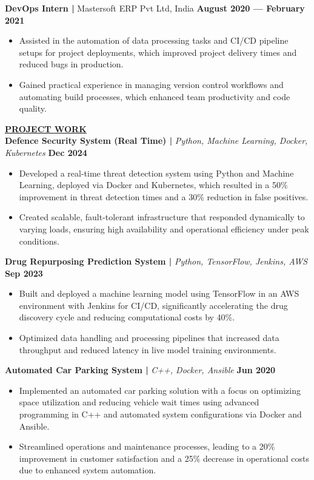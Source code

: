 \documentclass{article}
\begin{document}
\noindent \textbf{DevOps Intern | } Mastersoft ERP Pvt Ltd, India \hfill \textbf{August 2020 — February 2021}
\begin{itemize}[noitemsep,nolistsep,leftmargin=*]
\item {\small Assisted in the automation of data processing tasks and CI/CD pipeline setups for project deployments, which improved project delivery times and reduced bugs in production.}
\item {\small Gained practical experience in managing version control workflows and automating build processes, which enhanced team productivity and code quality.}\\
\end{itemize}

\noindent \textbf{\underline{PROJECT WORK}} \\
\noindent \textbf{Defence Security System (Real Time) | } \textit{Python, Machine Learning, Docker, Kubernetes} \hfill \textbf{Dec 2024}
\begin{itemize}[noitemsep,nolistsep,leftmargin=*]
\item {\small Developed a real-time threat detection system using Python and Machine Learning, deployed via Docker and Kubernetes, which resulted in a 50\% improvement in threat detection times and a 30\% reduction in false positives.}
\item {\small Created scalable, fault-tolerant infrastructure that responded dynamically to varying loads, ensuring high availability and operational efficiency under peak conditions.}
\end{itemize}

\noindent \textbf{Drug Repurposing Prediction System | } \textit{Python, TensorFlow, Jenkins, AWS} \hfill \textbf{Sep 2023}
\begin{itemize}[noitemsep,nolistsep,leftmargin=*]
\item {\small Built and deployed a machine learning model using TensorFlow in an AWS environment with Jenkins for CI/CD, significantly accelerating the drug discovery cycle and reducing computational costs by 40\%.}
\item {\small Optimized data handling and processing pipelines that increased data throughput and reduced latency in live model training environments.}
\end{itemize}

\noindent \textbf{Automated Car Parking System | } \textit{C++, Docker, Ansible} \hfill \textbf{Jun 2020}
\begin{itemize}[noitemsep,nolistsep,leftmargin=*]
\item {\small Implemented an automated car parking solution with a focus on optimizing space utilization and reducing vehicle wait times using advanced programming in C++ and automated system configurations via Docker and Ansible.}
\item {\small Streamlined operations and maintenance processes, leading to a 20\% improvement in customer satisfaction and a 25\% decrease in operational costs due to enhanced system automation.}\\
\end{itemize}
\end{document}
